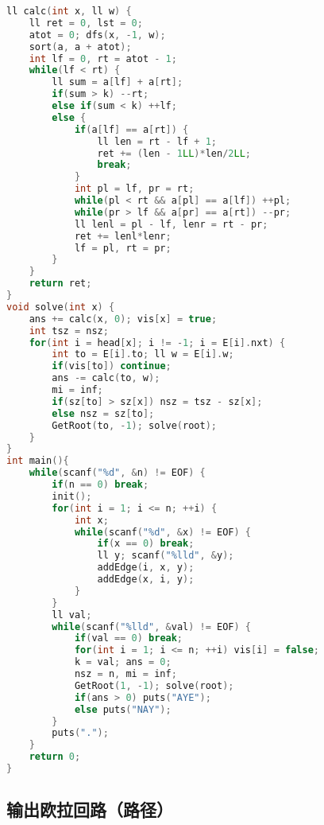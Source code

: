 \begin{lstlisting}[language=C++]
ll calc(int x, ll w) {
    ll ret = 0, lst = 0;
    atot = 0; dfs(x, -1, w);
    sort(a, a + atot);
    int lf = 0, rt = atot - 1;
    while(lf < rt) {
        ll sum = a[lf] + a[rt];
        if(sum > k) --rt;
        else if(sum < k) ++lf;
        else {
            if(a[lf] == a[rt]) {
                ll len = rt - lf + 1;
                ret += (len - 1LL)*len/2LL;
                break;
            }
            int pl = lf, pr = rt;
            while(pl < rt && a[pl] == a[lf]) ++pl;
            while(pr > lf && a[pr] == a[rt]) --pr;
            ll lenl = pl - lf, lenr = rt - pr;
            ret += lenl*lenr;
            lf = pl, rt = pr;
        }
    }
    return ret;
}
void solve(int x) {
    ans += calc(x, 0); vis[x] = true;
    int tsz = nsz;
    for(int i = head[x]; i != -1; i = E[i].nxt) {
        int to = E[i].to; ll w = E[i].w;
        if(vis[to]) continue;
        ans -= calc(to, w);
        mi = inf;
        if(sz[to] > sz[x]) nsz = tsz - sz[x];
        else nsz = sz[to];
        GetRoot(to, -1); solve(root);
    }
}
int main(){
    while(scanf("%d", &n) != EOF) {
        if(n == 0) break;
        init();
        for(int i = 1; i <= n; ++i) {
            int x;
            while(scanf("%d", &x) != EOF) {
                if(x == 0) break;
                ll y; scanf("%lld", &y);
                addEdge(i, x, y);
                addEdge(x, i, y);
            }
        }
        ll val;
        while(scanf("%lld", &val) != EOF) {
            if(val == 0) break;
            for(int i = 1; i <= n; ++i) vis[i] = false;
            k = val; ans = 0;
            nsz = n, mi = inf;
            GetRoot(1, -1); solve(root);
            if(ans > 0) puts("AYE");
            else puts("NAY");
        }
        puts(".");
    }
    return 0;
}
\end{lstlisting}

\subsection{输出欧拉回路（路径）}

